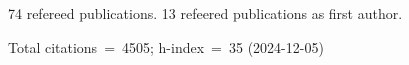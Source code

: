 74 refereed publications. 13 refeered publications as first author.

Total citations~=~4505; h-index~=~35 (2024-12-05)